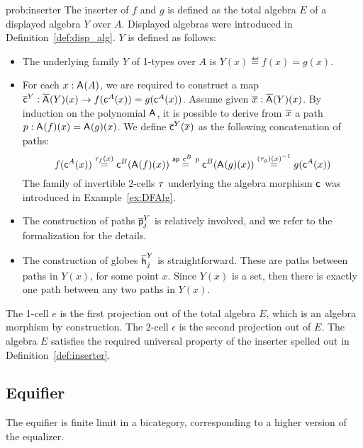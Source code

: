 \begin{construction}{prob:inserter}\label{cons:inserter}
The inserter of $f$ and $g$ is defined as the total algebra $E$ of a
displayed algebra $Y$ over $A$. Displayed algebras were
introduced in Definition~\ref{def:disp_alg}. $Y$ is defined as follows:
\begin{itemize}
\item The underlying family $Y$ of 1-types over $A$ is $Y(x) \eqdef f(x) = g(x)$.
\item
For each $x : \mathsf{A}^{}(A)$, we are required to construct
a map $\overline{\mathsf{c}}^{Y} : \overline{\mathsf{A}^{}}(Y)(x) \rightarrow
f(\mathsf{c}^{A}(x)) = g (\mathsf{c}^{A}(x))$. Assume given $\overline{x}
: \overline{\mathsf{A}^{}}(Y)(x)$. By induction on the polynomial
$\mathsf{A}^{}$, it is possible to derive from $\overline{x}$ a path $p
: \mathsf{A}^{}(f)(x) = \mathsf{A}^{}(g)(x)$.  We
define $\overline{\mathsf{c}}^{Y}(\overline{x})$ as the following concatenation of paths:
\[
f(\mathsf{c}^{A}(x))
\stackrel{\tau_f(x)}{=} \mathsf{c}^{B}(\mathsf{A}^{}(f)(x))
\stackrel{\mathsf{ap} \ \mathsf{c}^{B} \ p}{=} \mathsf{c}^{B}(\mathsf{A}^{}(g)(x))
\stackrel{(\tau_g)(x)^{-1}}{=} g (\mathsf{c}^{A}(x))
\]
The family of invertible 2-cells $\tau$ underlying the algebra
morphism $\mathsf{c}^{}$ was introduced in Example~\ref{ex:DFAlg}.
\item The construction of paths $\overline{\mathsf{p}}^{Y}_{j}$ is relatively involved, and we refer to the formalization for the details.
\item
The construction of globes $\overline{\mathsf{h}}^{Y}_{j}$ is
straightforward. These are paths between paths in $Y(x)$, for some
point $x$. Since $Y(x)$ is a set, then there is exactly one path
between any two paths in $Y(x)$.
\end{itemize}

The 1-cell $e$ is the first projection out of the total algebra $E$, which
is an algebra morphism by construction. The 2-cell $\epsilon$ is the
second projection out of $E$. The algebra $E$ satisfies the required
universal property of the inserter spelled out in Definition~\ref{def:inserter}.
\end{construction}

\subsection{Equifier}

The equifier is finite limit in a bicategory, corresponding to a
higher version of the equalizer.

